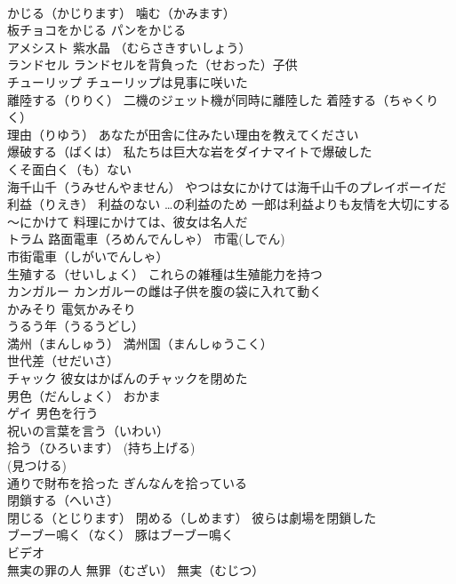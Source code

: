 \documentclass[8pt]{extreport}
\begin{document}
\begin{CJK}{UTF8}{min}
\\	かじる（かじります） 噛む（かみます）
\\	板チョコをかじる パンをかじる
\\	アメシスト 紫水晶 （むらさきすいしょう）
\\	ランドセル ランドセルを背負った（せおった）子供
\\	チューリップ チューリップは見事に咲いた
\\	離陸する（りりく） 二機のジェット機が同時に離陸した 着陸する（ちゃくりく）
\\	理由（りゆう） あなたが田舎に住みたい理由を教えてください
\\	爆破する（ばくは） 私たちは巨大な岩をダイナマイトで爆破した
\\	くそ面白く（も）ない
\\	海千山千（うみせんやません） やつは女にかけては海千山千のプレイボーイだ
\\	利益（りえき） 利益のない …の利益のため 一郎は利益よりも友情を大切にする
\\	～にかけて 料理にかけては、彼女は名人だ
\\	トラム 路面電車（ろめんでんしゃ） 市電(しでん) 
\\	市街電車（しがいでんしゃ）
\\	生殖する（せいしょく） これらの雑種は生殖能力を持つ
\\	カンガルー カンガルーの雌は子供を腹の袋に入れて動く
\\	かみそり 電気かみそり
\\	うるう年（うるうどし）
\\	満州（まんしゅう） 満州国（まんしゅうこく）
\\	世代差（せだいさ）
\\	チャック 彼女はかばんのチャックを閉めた
\\	男色（だんしょく） おかま 
\\	ゲイ 男色を行う
\\	祝いの言葉を言う（いわい）
\\	拾う（ひろいます） (持ち上げる) 
\\	(見つける) 
\\	通りで財布を拾った ぎんなんを拾っている
\\	閉鎖する（へいさ）
\\	閉じる（とじります） 閉める（しめます） 彼らは劇場を閉鎖した
\\	ブーブー鳴く（なく） 豚はブーブー鳴く
\\	ビデオ
\\	無実の罪の人 無罪（むざい） 無実（むじつ）

\end{CJK}
\end{document}
